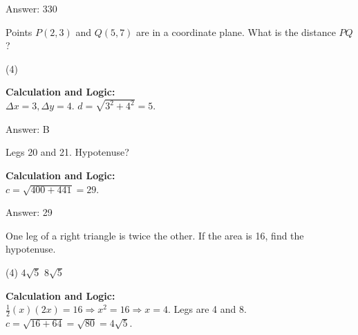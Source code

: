 \documentclass[11pt,paper=a4,answers]{exam}
\begin{document}
\begin{questions}
\begin{solution}
\vspace{30pt}

Answer: \colorbox{yellow!100}{330}
\end{solution}

\vspace{60pt}

\question
Points $P(2,3)$ and $Q(5,7)$ are in a coordinate plane. What is the distance $PQ$?
\begin{tasks}(4)
\end{tasks}

\begin{solution}
\textbf{Calculation and Logic:} \\
$\Delta x = 3, \Delta y = 4$. $d = \sqrt{3^2 + 4^2} = 5$.

\vspace{30pt}

Answer: \colorbox{yellow!100}{B}
\end{solution}

\vspace{60pt}

\question
Legs 20 and 21. Hypotenuse?

\begin{solution}
\textbf{Calculation and Logic:} \\
$c = \sqrt{400 + 441} = 29$.

\vspace{30pt}

Answer: \colorbox{yellow!100}{29}
\end{solution}

\vspace{60pt}

\question
One leg of a right triangle is twice the other. If the area is 16, find the hypotenuse.
\begin{tasks}(4)
    \task $4\sqrt{5}$
    \task $8\sqrt{5}$
\end{tasks}

\begin{solution}
\textbf{Calculation and Logic:} \\
$\frac{1}{2}(x)(2x) = 16 \Rightarrow x^2 = 16 \Rightarrow x = 4$. Legs are 4 and 8. $c = \sqrt{16 + 64} = \sqrt{80} = 4\sqrt{5}$.


\end{solution}
\end{questions}
\end{document}
